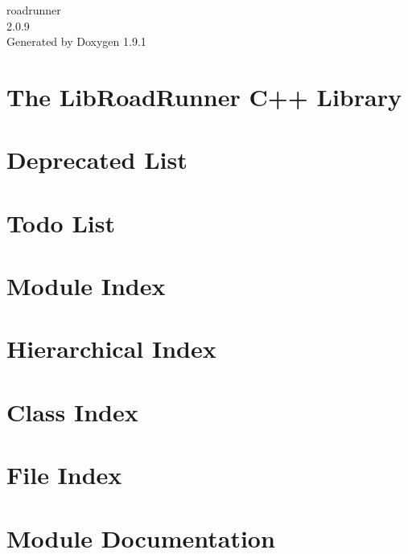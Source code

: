 \let\mypdfximage\pdfximage\def\pdfximage{\immediate\mypdfximage}\documentclass[twoside]{book}
\newcommand{\+}{\discretionary{\mbox{\scriptsize$\hookleftarrow$}}{}{}}
\newcommand{\clearemptydoublepage}{%
  \newpage{\pagestyle{empty}\cleardoublepage}%
}
\begin{document}
\raggedbottom

\hypersetup{pageanchor=false,
             bookmarksnumbered=true,
             pdfencoding=unicode
            }
\begin{titlepage}
\vspace*{7cm}
\begin{center}%
{\Large roadrunner \\[1ex]\large 2.\+0.\+9 }\\
\vspace*{1cm}
{\large Generated by Doxygen 1.9.1}\\
\end{center}
\end{titlepage}
\clearemptydoublepage
{}
\tableofcontents
\clearemptydoublepage
{}
\hypersetup{pageanchor=true}

\chapter{The Lib\+Road\+Runner C++ Library}
\label{index}\hypertarget{index}{}
\chapter{Deprecated List}
\label{deprecated}

\chapter{Todo List}
\label{todo}

\chapter{Module Index}

\chapter{Hierarchical Index}

\chapter{Class Index}

\chapter{File Index}

\chapter{Module Documentation}





























\end{document}
